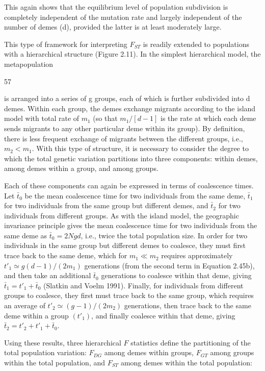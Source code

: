 \documentclass{article}
\begin{document}
This again shows that the equilibrium level of population subdivision is completely independent of the mutation rate and largely independent of the number of demes (d), provided the latter is at least moderately large.

This type of framework for interpreting  $ F_{ST} $ is readily extended to populations with a hierarchical structure (Figure 2.11). In the simplest hierarchical model, the metapopulation

57

is arranged into a series of g groups, each of which is further subdivided into d demes. Within each group, the demes exchange migrants according to the island model with total rate of  $ m_1 $ (so that  $ m_1/[d - 1] $ is the rate at which each deme sends migrants to any other particular deme within its group). By definition, there is less frequent exchange of migrants between the different groups, i.e.,  $ m_2 < m_1 $. With this type of structure, it is necessary to consider the degree to which the total genetic variation partitions into three components: within demes, among demes within a group, and among groups.

Each of these components can again be expressed in terms of coalescence times. Let  $ \bar{t}_0 $ be the mean coalescence time for two individuals from the same deme,  $ \bar{t}_1 $ for two individuals from the same group but different demes, and  $ \bar{t}_2 $ for two individuals from different groups. As with the island model, the geographic invariance principle gives the mean coalescence time for two individuals from the same deme as  $ \bar{t}_0 = 2Ng d $, i.e., twice the total population size. In order for two individuals in the same group but different demes to coalesce, they must first trace back to the same deme, which for  $ m_1 \ll m_2 $ requires approximately  $ t'_1 \simeq g(d - 1)/(2m_1) $ generations (from the second term in Equation 2.45b), and then take an additional  $ \bar{t}_0 $ generations to coalesce within that deme, giving  $ \bar{t}_1 = t'_1 + \bar{t}_0 $ (Slatkin and Voelm 1991). Finally, for individuals from different groups to coalesce, they first must trace back to the same group, which requires an average of  $ t'_2 \simeq (g - 1)/(2m_2) $ generations, then trace back to the same deme within a group  $ (t'_1) $, and finally coalesce within that deme, giving  $ \bar{t}_2 = t'_2 + t'_1 + \bar{t}_0 $.

Using these results, three hierarchical  $ F $ statistics define the partitioning of the total population variation:  $ F_{DG} $ among demes within groups,  $ F_{GT} $ among groups within the total population, and  $ F_{ST} $ among demes within the total population:
\end{document}

